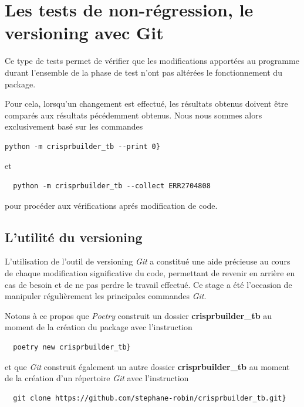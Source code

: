 \documentclass[twoside,a4paper,11pt,frenchb,openany]{report}
\begin{document}
\section{Les tests de non-régression, le versioning avec Git}

Ce type de tests permet de vérifier que les modifications apportées au programme durant l'ensemble de la phase de test n'ont pas altérées le fonctionnement du package.

Pour cela, lorsqu'un changement est effectué, les résultats obtenus doivent être comparés aux résultats pécédemment obtenus. Nous nous sommes alors exclusivement basé sur les commandes

\begin{verbatim}python -m crisprbuilder_tb --print 0}\end{verbatim}

et 

\begin{verbatim}  python -m crisprbuilder_tb --collect ERR2704808\end{verbatim}

pour procéder aux vérifications aprés modification de code.

\subsection{L'utilité du versioning}

L'utilisation de l'outil de versioning \textit{Git} a constitué une aide précieuse au cours de chaque modification significative du code, permettant de revenir en arrière en cas de besoin et de ne pas perdre le travail effectué. Ce stage a été l'occasion de manipuler régulièrement les principales commandes \textit{Git}. 

Notons à ce propos que \textit{Poetry} construit un dossier \textbf{crisprbuilder\_tb} au moment de la création du package avec l'instruction

 \begin{verbatim}  poetry new crisprbuilder_tb}\end{verbatim}

et que \textit{Git} construit également un autre dossier \textbf{crisprbuilder\_tb} au moment de la création d'un répertoire \textit{Git} avec l'instruction

\begin{verbatim}  git clone https://github.com/stephane-robin/crisprbuilder_tb.git}\end{verbatim}
\end{document}

